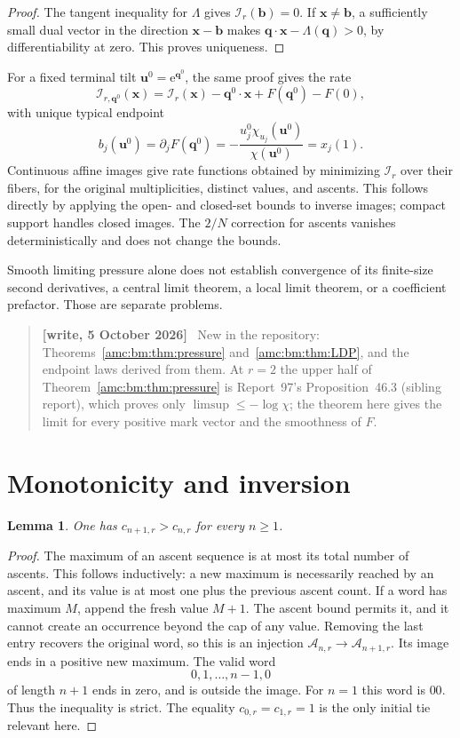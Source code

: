 \documentclass[11pt,letterpaper]{article}
\newtheorem{lemma}[theorem]{Lemma}
\theoremstyle{remark}\newtheorem{remark}[theorem]{Remark}
\newcommand{\ee}{\mathrm e}
\newcommand{\cA}{\mathcal A}
\newcommand{\bu}{\boldsymbol u}
\newcommand{\bx}{\boldsymbol x}
\newenvironment{writenotedated}[1]{\par\smallskip\begin{quote}\small\textbf{[write, #1]}\ }{\end{quote}\smallskip}
\begin{document}
\begin{proof}
The tangent inequality for $\Lambda$ gives $\mathcal I_r(\boldsymbol b)=0$. If $\bx\ne\boldsymbol b$, a sufficiently small dual vector in the direction $\bx-\boldsymbol b$ makes $\boldsymbol q\cdot\bx-\Lambda(\boldsymbol q)>0$, by differentiability at zero. This proves uniqueness.
\end{proof}

For a fixed terminal tilt $\bu^0=\ee^{\boldsymbol q^0}$, the same proof gives the rate
\[
 \mathcal I_{r,\boldsymbol q^0}(\bx)
 =\mathcal I_r(\bx)-\boldsymbol q^0\cdot\bx+F(\boldsymbol q^0)-F(0),
\]
with unique typical endpoint
\[
 b_j(\bu^0)=\partial_jF(\boldsymbol q^0)
 =-\frac{u_j^0\chi_{u_j}(\bu^0)}{\chi(\bu^0)}=x_j(1).
\]
Continuous affine images give rate functions obtained by minimizing $\mathcal I_r$ over their fibers, for the original multiplicities, distinct values, and ascents. This follows directly by applying the open- and closed-set bounds to inverse images; compact support handles closed images. The $2/N$ correction for ascents vanishes deterministically and does not change the bounds.

Smooth limiting pressure alone does not establish convergence of its finite-size second derivatives, a central limit theorem, a local limit theorem, or a coefficient prefactor. Those are separate problems.

\begin{writenotedated}{5 October 2026}
New in the repository: Theorems~\ref{amc:bm:thm:pressure} and~\ref{amc:bm:thm:LDP}, and the endpoint laws derived from them. At $r=2$ the upper half of Theorem~\ref{amc:bm:thm:pressure} is Report~97's Proposition~46.3 (sibling report), which proves only $\limsup\le-\log\chi$; the theorem here gives the limit for every positive mark vector and the smoothness of $F$.
\end{writenotedated}

\section{Monotonicity and inversion}\label{amc:bm:sec:inverse}
\begin{lemma}\label{amc:bm:lem:monotonicity}
One has $c_{n+1,r}>c_{n,r}$ for every $n\ge1$.
\end{lemma}
\begin{proof}
The maximum of an ascent sequence is at most its total number of ascents. This follows inductively: a new maximum is necessarily reached by an ascent, and its value is at most one plus the previous ascent count. If a word has maximum $M$, append the fresh value $M+1$. The ascent bound permits it, and it cannot create an occurrence beyond the cap of any value. Removing the last entry recovers the original word, so this is an injection $\cA_{n,r}\to\cA_{n+1,r}$. Its image ends in a positive new maximum. The valid word
\[
 0,1,\ldots,n-1,0
\]
of length $n+1$ ends in zero, and is outside the image. For $n=1$ this word is $00$. Thus the inequality is strict. The equality $c_{0,r}=c_{1,r}=1$ is the only initial tie relevant here.
\end{proof}
\end{document}
